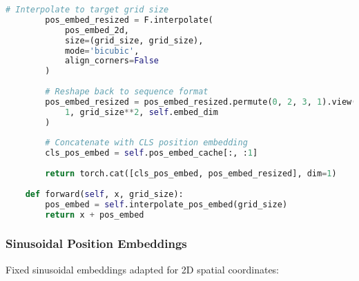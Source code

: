 \begin{lstlisting}[language=Python, caption=Learned absolute position embeddings]
        # Interpolate to target grid size
        pos_embed_resized = F.interpolate(
            pos_embed_2d, 
            size=(grid_size, grid_size), 
            mode='bicubic',
            align_corners=False
        )
        
        # Reshape back to sequence format
        pos_embed_resized = pos_embed_resized.permute(0, 2, 3, 1).view(
            1, grid_size**2, self.embed_dim
        )
        
        # Concatenate with CLS position embedding
        cls_pos_embed = self.pos_embed_cache[:, :1]
        
        return torch.cat([cls_pos_embed, pos_embed_resized], dim=1)
    
    def forward(self, x, grid_size):
        pos_embed = self.interpolate_pos_embed(grid_size)
        return x + pos_embed
\end{lstlisting}

\subsubsection{Sinusoidal Position Embeddings}

Fixed sinusoidal embeddings adapted for 2D spatial coordinates:

